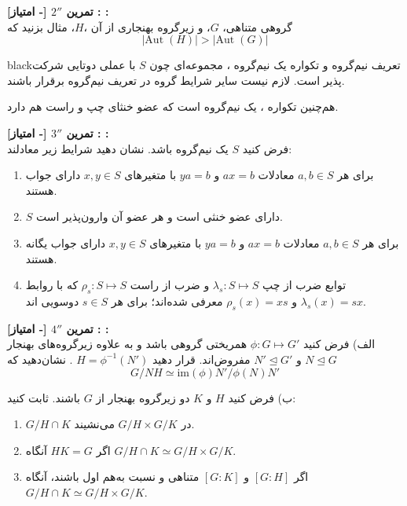 \documentclass{article}
\newenvironment{exercise}[3][\unskip]{%
	\par
	\noindent
	\textbf{تمرین
		#1
		[#2 امتیاز] 
		\def\temp{#3}\ifx\temp\empty
		: 
		\else
		: #3 \vspace{0.5em} \\ \noindent
		\fi
}}{}
\begin{document}
\begin{exercise}[$2''$]{-}{ }
	گروهی متناهی، $G$، و زیرگروه بهنجاری از آن ،$H$، مثال بزنید که 
	\[
	|\text{Aut}\; (H)| > |\text{Aut}\; (G)|
	\]
\end{exercise}

\begin{boxes}{black}{تعریف نیم‌گروه و تکواره}
	یک نیم‌گروه
	، مجموعه‌ای چون
	$S$
	با عملی دوتایی شرکت پذیر است. لازم نیست سایر شرایط گروه در تعریف نیم‌گروه برقرار باشند.
	
	هم‌چنین تکواره 
	، یک نیم‌گروه است که عضو خنثای  چپ و راست هم دارد.
\end{boxes}


\begin{exercise}[$3''$]{-}{ }
	فرض کنید 
	$S$ یک نیم‌گروه باشد. نشان دهید شرایط زیر معادلند:
	\begin{enumerate}
		\item برای هر 
		$a,b\in S$
		معادلات 
		$ax=b$
		و
		$ya=b$
		با متغیرهای 
		$x,y \in S$
		دارای جواب هستند.
		\item $S$ دارای عضو خنثی است و هر عضو آن وارون‌پذیر است.
		\item برای هر 
		$a,b\in S$
		معادلات 
		$ax=b$
		و
		$ya=b$
		با متغیرهای 
		$x,y \in S$
		دارای جواب یگانه هستند.
		\item توابع ضرب از چپ
		$\lambda_s: S \longmapsto S$
		و ضرب از راست
		$\rho_s: S \longmapsto S$
		که با روابط 
		$\lambda_s(x) = sx$
		و 
		$\rho_s(x) = xs$
		معرفی‌ شده‌اند؛ برای هر 
		$s\in S$
		دوسویی اند.
	\end{enumerate}
\end{exercise}

\begin{exercise}[$4''$]{-}{ }
	الف)
	فرض کنید 
	$\phi: G\longmapsto G'$
	همریختی گروهی باشد و به علاوه زیرگروه‌های بهنجار 
	$N\trianglelefteq G$
	و
	$N' \trianglelefteq G'$
	مفروض‌اند. قرار دهید 
	$H = \phi^{-1}(N')$
	.
	نشان‌دهید که
	\[
	G/NH \simeq \text{im} (\phi) N' / \phi(N)N'
	\]
	
	\noindent
	ب)
	فرض کنید $H$ و $K$ دو زیرگروه بهنجار از $G$ باشند. ثابت کنید:
	\begin{enumerate}
		\item 
		$G/H\cap K $
		در
		$G/H \times G/K$
		می‌نشیند.
		\item اگر
		$HK=G$
		آنگاه
		$G/H\cap K \simeq G/H \times G/K$.
		\item 
		اگر 
		$[G:H]$
		و
		$[G:K]$
		متناهی و نسبت به‌هم اول باشند، آنگاه
		$G/H\cap K \simeq G/H \times G/K$.
	\end{enumerate}
\end{exercise}
\end{document}
